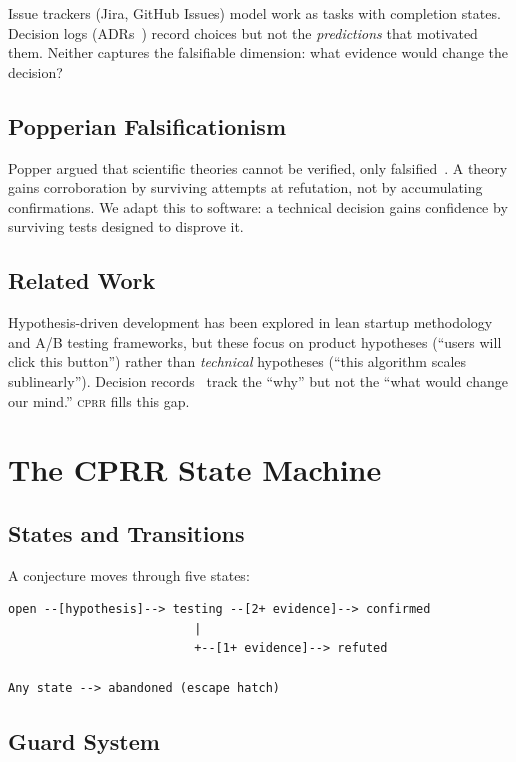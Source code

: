 \documentclass[sigconf,screen]{acmart}
\begin{document}
Issue trackers (Jira, GitHub Issues) model work as tasks with completion states. Decision logs (ADRs~\cite{nygard2011adr}) record choices but not the \emph{predictions} that motivated them. Neither captures the falsifiable dimension: what evidence would change the decision?

\subsection{Popperian Falsificationism}

Popper argued that scientific theories cannot be verified, only falsified~\cite{popper1959logic}. A theory gains corroboration by surviving attempts at refutation, not by accumulating confirmations. We adapt this to software: a technical decision gains confidence by surviving tests designed to disprove it.

\subsection{Related Work}

Hypothesis-driven development has been explored in lean startup methodology~\cite{ries2011lean} and A/B testing frameworks, but these focus on product hypotheses (``users will click this button'') rather than \emph{technical} hypotheses (``this algorithm scales sublinearly''). Decision records~\cite{nygard2011adr} track the ``why'' but not the ``what would change our mind.'' \textsc{cprr} fills this gap.

\section{The CPRR State Machine}\label{sec:statemachine}

\subsection{States and Transitions}

A conjecture moves through five states:

\begin{verbatim}
open --[hypothesis]--> testing --[2+ evidence]--> confirmed
                          |
                          +--[1+ evidence]--> refuted

Any state --> abandoned (escape hatch)
\end{verbatim}

\subsection{Guard System}
\end{document}

